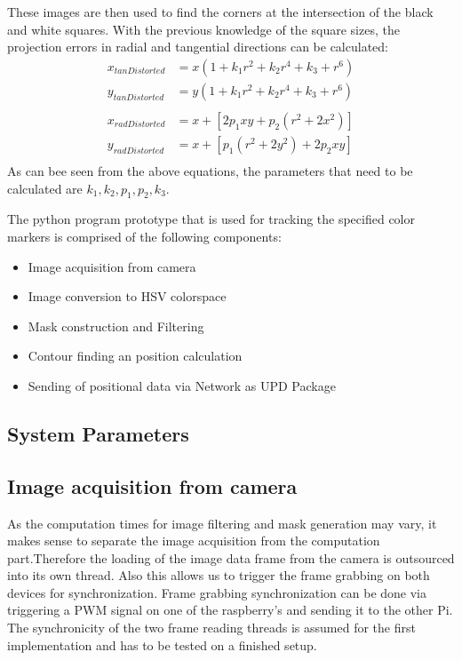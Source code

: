These images are then used to find the corners at the intersection of the black and white squares. With the previous knowledge of the square sizes, the projection errors in radial and tangential directions can be calculated:
\begin{equation}
\begin{split}
x_{tanDistorted}&=x(1+k_{1}r^{2}+k_{2}r^{4}+k_{3}+r^{6})\\
y_{tanDistorted}&=y(1+k_{1}r^{2}+k_{2}r^{4}+k_{3}+r^{6})\\
\\
x_{radDistorted}&=x+[2p_{1}xy+p_{2}(r^{2}+2x^{2})]\\
y_{radDistorted}&=x+[p_{1}(r^{2}+2y^{2})+2p_{2}xy]\\
\end{split}
\end{equation} 
As can bee seen from the above equations, the parameters that need to be calculated are $k_{1},k_{2},p_{1},p_{2},k_{3}$.

The python program prototype that is used for tracking the specified color markers is comprised of the following components:
\begin{itemize}
\item Image acquisition from camera
\item Image conversion to HSV colorspace
\item Mask construction and Filtering
\item Contour finding an position calculation
\item Sending of positional data via Network as UPD Package
\end{itemize}
\subsection{System Parameters}
\label{System Parameters}



\subsection{Image acquisition from camera}
As the computation times for image filtering and mask generation may vary, it makes sense to separate the image acquisition from the computation part.Therefore the loading of the image data frame from the camera is outsourced into its own thread. Also this allows us to trigger the frame grabbing on both devices for synchronization. Frame grabbing synchronization can be done via triggering a PWM signal on one of the raspberry's and sending it to the other Pi.
The synchronicity of the two frame reading threads is assumed for the first implementation and has to be tested on a finished setup.

